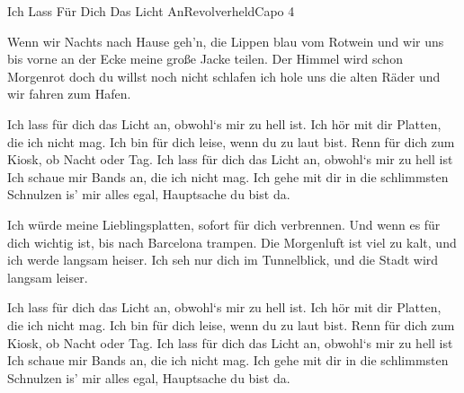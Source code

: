 \begin{song}{Ich Lass Für Dich Das Licht An}{Revolverheld}{Capo 4}


Wenn wir Nachts nach Hause geh'n,
die Lippen blau vom Rotwein
und wir uns bis vorne an der Ecke
meine große Jacke teilen.
Der Himmel wird schon Morgenrot
doch du willst noch nicht schlafen
ich hole uns die alten Räder
und wir fahren zum Hafen.

Ich lass für dich das Licht an, obwohl`s mir zu hell ist.
Ich hör mit dir Platten, die ich nicht mag.
Ich bin für dich leise, wenn du zu laut bist.
Renn für dich zum Kiosk, ob Nacht oder Tag.
Ich lass für dich das Licht an, obwohl`s mir zu hell ist
Ich schaue mir Bands an, die ich nicht mag.
Ich gehe mit dir in die schlimmsten Schnulzen
is' mir alles egal, Hauptsache du bist da.

Ich würde meine Lieblingsplatten,
sofort für dich verbrennen.
Und wenn es für dich wichtig ist,
bis nach Barcelona trampen.
Die Morgenluft ist viel zu kalt,
und ich werde langsam heiser.
Ich seh nur dich im Tunnelblick,
und die Stadt wird langsam leiser.

Ich lass für dich das Licht an, obwohl`s mir zu hell ist.
Ich hör mit dir Platten, die ich nicht mag.
Ich bin für dich leise, wenn du zu laut bist.
Renn für dich zum Kiosk, ob Nacht oder Tag.
Ich lass für dich das Licht an, obwohl`s mir zu hell ist
Ich schaue mir Bands an, die ich nicht mag.
Ich gehe mit dir in die schlimmsten Schnulzen
is' mir alles egal, Hauptsache du bist da.


\end{song}
